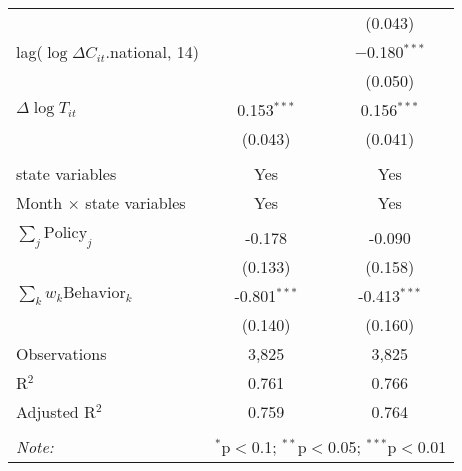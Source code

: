 \begin{tabular}{@{\extracolsep{1pt}}lcc}
  &  & (0.043) \\ 
  lag($\log \Delta C_{it}$.national, 14) &  & $-$0.180$^{***}$ \\ 
  &  & (0.050) \\ 
  $\Delta \log T_{it}$ & 0.153$^{***}$ & 0.156$^{***}$ \\ 
  & (0.043) & (0.041) \\ 
 \hline \\[-1.8ex] 
state variables & Yes & Yes \\ 
Month $\times$ state variables & Yes & Yes \\ 
\hline \\[-1.8ex] 
$\sum_j \mathrm{Policy}_j$ & -0.178 & -0.090 \\ 
 & (0.133) & (0.158) \\ 
$\sum_k w_k \mathrm{Behavior}_k$ & -0.801$^{***}$ & -0.413$^{***}$ \\ 
 & (0.140) & (0.160) \\ 
Observations & 3,825 & 3,825 \\ 
R$^{2}$ & 0.761 & 0.766 \\ 
Adjusted R$^{2}$ & 0.759 & 0.764 \\ 
\hline 
\hline \\[-1.8ex] 
\textit{Note:}  & \multicolumn{2}{r}{$^{*}$p$<$0.1; $^{**}$p$<$0.05; $^{***}$p$<$0.01} \\ 
\end{tabular} 